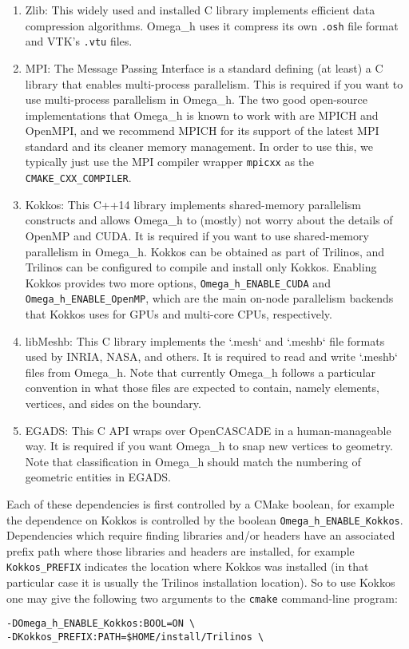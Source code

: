 \documentclass{article}
\begin{document}
\begin{enumerate}

\item Zlib: This widely used and installed C library implements
efficient data compression algorithms.
Omega\_h uses it compress its own \texttt{.osh} file format and
VTK's \texttt{.vtu} files.

\item MPI: The Message Passing Interface is a standard
defining (at least) a C library that enables multi-process parallelism.
This is required if you want to use multi-process parallelism
in Omega\_h.
The two good open-source implementations that Omega\_h is known
to work with are MPICH and OpenMPI, and we recommend
MPICH for its support of the latest MPI standard and its
cleaner memory management.
In order to use this, we typically just use the MPI compiler wrapper
\texttt{mpicxx} as the \texttt{CMAKE\_CXX\_COMPILER}.

\item Kokkos: This C++14 library implements shared-memory parallelism
constructs and allows Omega\_h to (mostly) not worry about the details
of OpenMP and CUDA.
It is required if you want to use shared-memory parallelism in Omega\_h.
Kokkos can be obtained as part of Trilinos, and Trilinos can be configured
to compile and install only Kokkos.
Enabling Kokkos provides two more options, \texttt{Omega\_h\_ENABLE\_CUDA}
and \texttt{Omega\_h\_ENABLE\_OpenMP}, which are the main on-node
parallelism backends that Kokkos uses for GPUs and multi-core CPUs,
respectively.

\item libMeshb: This C library implements the `.mesh` and `.meshb`
file formats used by INRIA, NASA, and others.
It is required to read and write `.meshb` files from Omega\_h.
Note that currently Omega\_h follows a particular convention in what
those files are expected to contain, namely elements, vertices,
and sides on the boundary.

\item EGADS: This C API wraps over OpenCASCADE in a human-manageable way.
It is required if you want Omega\_h to snap new vertices to geometry.
Note that classification in Omega\_h should match the numbering
of geometric entities in EGADS.

\end{enumerate}

Each of these dependencies is first controlled by a CMake boolean,
for example the dependence on Kokkos is controlled by the boolean
\texttt{Omega\_h\_ENABLE\_Kokkos}.
Dependencies which require finding libraries and/or headers have
an associated prefix path where those libraries and headers are installed,
for example \texttt{Kokkos\_PREFIX} indicates the location where
Kokkos was installed (in that particular case it is usually the
Trilinos installation location).
So to use Kokkos one may give the following two arguments to the
\texttt{cmake} command-line program:
\begin{lstlisting}
-DOmega_h_ENABLE_Kokkos:BOOL=ON \
-DKokkos_PREFIX:PATH=$HOME/install/Trilinos \
\end{lstlisting}
\end{document}
